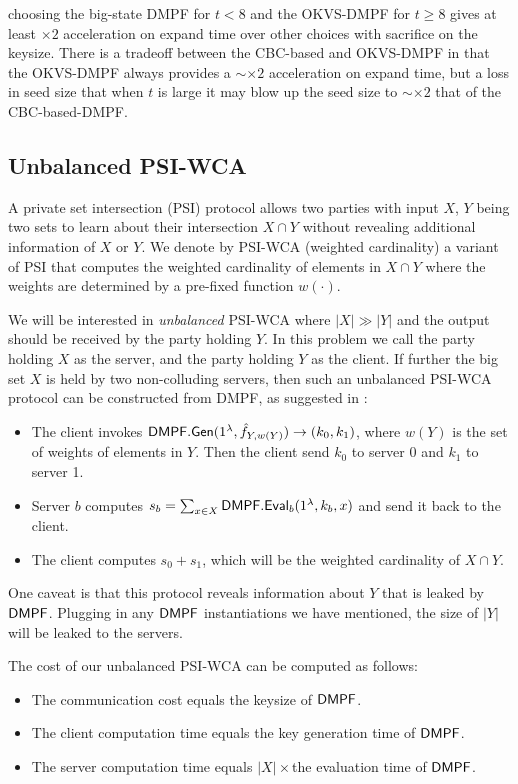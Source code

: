  choosing the big-state DMPF for $t<8$ and the OKVS-DMPF for $t\ge 8$ gives at least $\times 2$ acceleration on expand time over other choices with sacrifice on the keysize. There is a tradeoff between the CBC-based and OKVS-DMPF in that the OKVS-DMPF always provides a $\sim\times 2$ acceleration on expand time, but a loss in seed size that when $t$ is large it may blow up the seed size to $\sim \times 2$ that of the CBC-based-DMPF. 

\subsection{Unbalanced PSI-WCA}
A private set intersection (PSI) protocol allows two parties with input $X$, $Y$ being two sets to learn about their intersection $X\cap Y$ without revealing additional information of $X$ or $Y$. We denote by PSI-WCA (weighted cardinality) a variant of PSI that computes the weighted cardinality of elements in $X\cap Y$ where the weights are determined by a pre-fixed function $w(\cdot)$. 

We will be interested in \emph{unbalanced} PSI-WCA where $|X|\gg |Y|$ and the output should be received by the party holding $Y$. In this problem we call the party holding $X$ as the server, and the party holding $Y$ as the client. If further the big set $X$ is held by two non-colluding servers, then such an unbalanced PSI-WCA protocol can be constructed from DMPF, as suggested in \cite{cryptoeprint:2020/1599}: 
\begin{itemize}
  \item The client invokes ${\sf DMPF}.{\sf Gen}(1^\lambda, \hat{f}_{Y,w(Y)})\rightarrow (k_0,k_1)$, where $w(Y)$ is the set of weights of elements in $Y$. Then the client send $k_0$ to server 0 and $k_1$ to server 1. 
  \item Server $b$ computes $s_b=\sum_{x\in X}{\sf DMPF}.{\sf Eval}_b(1^\lambda, k_b,x)$ and send it back to the client. 
  \item The client computes $s_0+s_1$, which will be the weighted cardinality of $X\cap Y$. 
\end{itemize}
One caveat is that this protocol reveals information about $Y$ that is leaked by ${\sf DMPF}$. Plugging in any ${\sf DMPF}$ instantiations we have mentioned, the size of $|Y|$ will be leaked to the servers. 

The cost of our unbalanced PSI-WCA can be computed as follows: 
\begin{itemize}
  \item The communication cost equals the keysize of ${\sf DMPF}$. 
  \item The client computation time equals the key generation time of ${\sf DMPF}$. 
  \item The server computation time equals $|X|\times$the evaluation time of ${\sf DMPF}$. 
\end{itemize}

